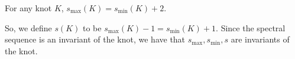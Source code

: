 \begin{prop}
For any knot $K$, $s_{\max}(K) = s_{\min}(K) + 2$.
\end{prop}

So, we define $s(K)$ to be $s_{\max}(K)-1 = s_{\min}(K)+1$. Since the spectral sequence is an invariant of the knot, we have that $s_{\max},s_{\min},s$ are invariants of the knot.










